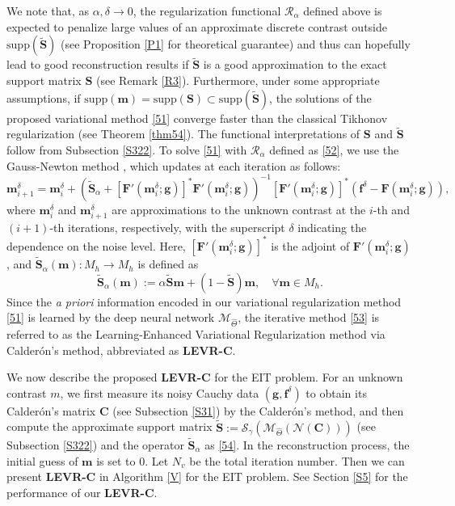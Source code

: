 \documentclass[11pt]{article}
\newcommand{\wit}{\widetilde}
\newcommand{\Calderon}{Calder\'{o}n}
\newcommand{\bds}[1]{\boldsymbol{#1}}
\begin{document}
We note that, as $\alpha, \delta\to 0$, the regularization functional $ \mathcal{R}_\alpha $ defined above is expected to penalize large values of an approximate discrete contrast outside $ \mathrm{supp}(\wit{\bds{S}}) $ (see Proposition \ref{P1} for theoretical guarantee) and thus can hopefully lead to good reconstruction results if $ \widetilde{\bds{S}} $ is a good approximation to the exact support matrix $ \bds{S} $ (see Remark \ref{R3}).
Furthermore, under some appropriate assumptions, if $ \mathrm{supp}(\bds{m}) = \mathrm{supp}(\bds{S}) \subset \mathrm{supp}(\wit{\bds{S}}) $, the solutions of the proposed variational method \eqref{51} converge faster than the classical Tikhonov regularization (see Theorem \ref{thm54}).
The functional interpretations of $ \bds{S} $ and $ \wit{\bds{S}} $ follow from Subsection \ref{S322}.
To solve \eqref{51} with $ \mathcal{R}_\alpha $ defined as \eqref{52}, we use the Gauss-Newton method \cite{GBM07, BA24}, which updates at each iteration as follows:
\begin{equation}\label{53}
\bds{m}^\delta_{i+1} =\bds{m}^\delta_i + \left(\wit{\bds{S}}_\alpha + \left[\bds{F}'(\bds{m}^\delta_i; \bds{g})\right]^*\bds{F}'(\bds{m}^\delta_i; \bds{g}) \right)^{-1}\left[\bds{F}'(\bds{m}^\delta_i; \bds{g})\right]^*\left(\bds{f}^\delta - \bds{F}(\bds{m}^\delta_i; \bds{g})\right),
\end{equation}
where $ \bds{m}^\delta_i $ and $ \bds{m}^\delta_{i+1} $ are approximations to the unknown contrast at the $ i $-th and $ (i+1) $-th iterations, respectively, with the superscript $\delta$ indicating the dependence on the noise level.
Here, $ \left[\bds{F}'(\bds{m}^\delta_i; \bds{g})\right]^* $ is the adjoint of $ \bds{F}'(\bds{m}^\delta_i; \bds{g}) $, and $ \wit{\bds{S}}_\alpha(\bds{m}): M_h\to M_h $ is defined as
\begin{equation}\label{54}
\wit{\bds{S}}_\alpha(\bds{m}) := \alpha\wit{\bds{S}}\bds{m} + (1-\wit{\bds{S}})\bds{m},\quad \forall \bds{m}\in M_h.
\end{equation}
Since the \textit{a priori} information encoded in our variational regularization method \eqref{51} is learned by the deep neural network $ \mathcal{M}_{\widehat{\Theta}} $, the iterative method \eqref{53} is referred to as the Learning-Enhanced Variational Regularization method via \Calderon's method, abbreviated as \textbf{LEVR-C}.

We now describe the proposed \textbf{LEVR-C} for the EIT problem.
For an unknown contrast $ m $, we first measure its noisy Cauchy data $ (\bds{g}, \bds{f}^\delta) $ to obtain its \Calderon's matrix $ \bds{C} $ (see Subsection \ref{S31}) by the \Calderon's method, and then compute the approximate support matrix $ \widetilde{\bds{S}} := \mathcal{S}_\gamma(\mathcal{M}_{\widehat{\Theta}}(\mathcal{N}(\bds{C}))) $ (see Subsection \ref{S322}) and the operator $ \wit{\bds{S}}_\alpha $ as \eqref{54}. 
In the reconstruction process, the initial guess of $ \bds{m} $ is set to $ 0 $.
Let $ N_v $ be the total iteration number.
Then we can present \textbf{LEVR-C} in Algorithm \ref{V} for the EIT problem.
See Section \ref{S5} for the performance of our \textbf{LEVR-C}.
\end{document}
